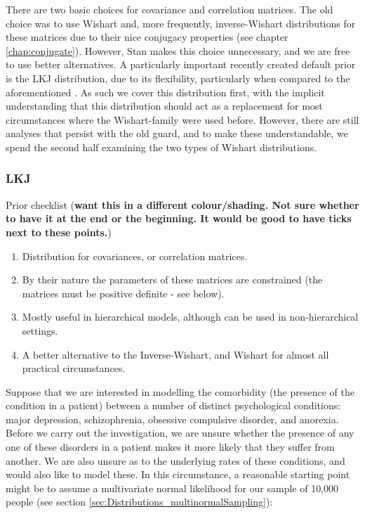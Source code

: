 \documentclass[11pt,fullpage]{book}
\begin{document}
There are two basic choices for covariance and correlation matrices. The old choice was to use Wishart and, more frequently, inverse-Wishart distributions for these matrices due to their nice conjugacy properties (see chapter \ref{chap:conjugate}). However, Stan makes this choice unnecessary, and we are free to use better alternatives. A particularly important recently created default prior is the LKJ distribution, due to its flexibility, particularly when compared to the aforementioned \cite{lewandowski2009generating}. As such we cover this distribution first, with the implicit understanding that this distribution should act as a replacement for most circumstances where the Wishart-family were used before. However, there are still analyses that persist with the old guard, and to make these understandable, we spend the second half examining the two types of Wishart distributions.

\subsubsection{LKJ}\label{sec:Distributions_LKJ}
Prior checklist (\textbf{want this in a different colour/shading. Not sure whether to have it at the end or the beginning. It would be good to have ticks next to these points.})

\begin{enumerate}
\item Distribution for covariances, or correlation matrices.
\item By their nature the parameters of these matrices are constrained (the matrices must be positive definite - see below).
\item Mostly useful in hierarchical models, although can be used in non-hierarchical settings.
\item A better alternative to the Inverse-Wishart, and Wishart for almost all practical circumstances.
\end{enumerate}

Suppose that we are interested in modelling the comorbidity (the presence of the condition in a patient) between a number of distinct psychological conditions: major depression, schizophrenia, obsessive compulsive disorder, and anorexia. Before we carry out the investigation, we are unsure whether the presence of any one of these disorders in a patient makes it more likely that they suffer from another. We are also unsure as to the underlying rates of these conditions, and would also like to model these. In this circumstance, a reasonable starting point might be to assume a multivariate normal likelihood for our sample of 10,000 people (see section \ref{sec:Distributions_multinormalSampling}):
\end{document}

